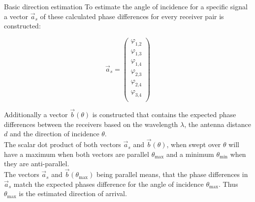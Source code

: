 \begin{subchapter}{Basic direction estimation}
  To estimate the angle of incidence for a specific
  signal a vector $\vec{a}_s$ of these calculated phase differences
  for every receiver pair is constructed:

  \begin{equation*}
    \vec{a}_s=
    \begin{pmatrix}
      \varphi_\text{1,2} \\
      \varphi_\text{1,3} \\
      \varphi_\text{1,4} \\
      \varphi_\text{2,3} \\
      \varphi_\text{2,4} \\
      \varphi_\text{3,4} \\
    \end{pmatrix}
  \end{equation*}

  Additionally a vector $\vec{b}(\theta)$ is constructed
  that contains the expected phase differences between the
  receivers based on the wavelength $\lambda$, the antenna distance $d$
  and the direction of incidence $\theta$. \\

  The scalar dot product of both vectors $\vec{a}_s$ and $\vec{b}(\theta)$,
  when swept over $\theta$ will have a maximum when both
  vectors are parallel $\theta_\text{max}$ and a minimum
  $\theta_\text{min}$ when they are anti-parallel. \\

  The vectors $\vec{a}_s$ and $\vec{b}(\theta_\text{max})$ being parallel
  means, that the phase differences in $\vec{a}_s$
  match the expected phases difference for the angle of
  incidence $\theta_\text{max}$.
  Thus $\theta_\text{max}$ is the estimated direction of arrival.
\end{subchapter}

